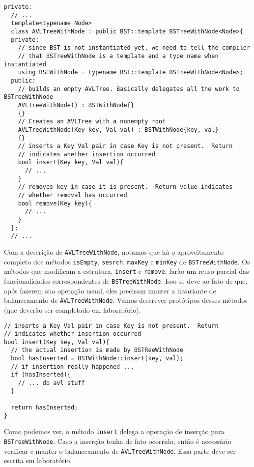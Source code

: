 \documentclass[11pt]{article}
\begin{document}
\begin{verbatim}
private:
  // ...
  template<typename Node>
  class AVLTreeWithNode : public BST::template BSTreeWithNode<Node>{
  private:
    // since BST is not instantiated yet, we need to tell the compiler
    // that BSTreeWithNode is a template and a type name when instantiated
    using BSTWithNode = typename BST::template BSTreeWithNode<Node>;
  public:
    // builds an empty AVLTree. Basically delegates all the work to BSTreeWithNode
    AVLTreeWithNode() : BSTWithNode{}
    {}
    // Creates an AVLTree with a nonempty root
    AVLTreeWithNode(Key key, Val val) : BSTWithNode{key, val}
    {}
    // inserts a Key Val pair in case Key is not present.  Return
    // indicates whether insertion occurred
    bool insert(Key key, Val val){
      // ...
    }
    // removes key in case it is present.  Return value indicates
    // whether removal has occurred
    bool remove(Key key){
      // ...
    }
  };
  // ...
\end{verbatim}

Com a descrição de \texttt{AVLTreeWithNode}, notamos que há o
aproveitamento completo dos métodos \texttt{isEmpty}, \texttt{sesrch}, \texttt{maxKey}
e \texttt{minKey} de \texttt{BSTreeWithNode}.  Os métodos que modificam a
estrutura, \texttt{insert} e \texttt{remove}, farão um reuso parcial das
funcionalidades correspondentes de \texttt{BSTreeWithNode}.  Isso se deve
ao fato de que, após fazerem sua operação usual, eles precisam
manter a invariante de balanceamento de \texttt{AVLTreeWithNode}.  Vamos
descrever protótipos desses métodos (que deverão ser completado em
laboratório).

\pagebreak

\begin{verbatim}
// inserts a Key Val pair in case Key is not present.  Return
// indicates whether insertion occurred
bool insert(Key key, Val val){
  // the actual insertion is made by BSTReeWithNode
  bool hasInserted = BSTWithNode::insert(key, val);
  // if insertion really happened ...
  if (hasInserted){
    // ... do avl stuff
  }

  return hasInserted;
}
\end{verbatim}

Como podemos ver, o método \texttt{insert} delega a operação de inserção
para \texttt{BSTreeWithNode}.  Caso a inserção tenha de fato ocorrido,
então é necessário verificar e manter o balanceamento de
\texttt{AVLTreeWithNode}.  Essa parte deve ser escrita em laboratório.
\end{document}

